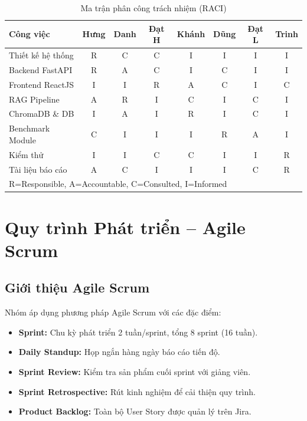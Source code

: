 \begin{table}[H]
  \centering
  \caption{Ma trận phân công trách nhiệm (RACI)}
  \label{tab:raci}
  \renewcommand{\arraystretch}{1.4}
  \begin{tabularx}{\textwidth}{|l|c|c|c|c|c|c|c|}
    \hline
    \rowcolor{blue!10}
    \textbf{Công việc} & \textbf{Hưng} & \textbf{Danh} & \textbf{Đạt H} & \textbf{Khánh} & \textbf{Dũng} & \textbf{Đạt L} & \textbf{Trinh} \\
    \hline
    Thiết kế hệ thống & R & C & C & I & I & I & I \\
    \hline
    Backend FastAPI & R & A & C & I & C & I & I \\
    \hline
    Frontend ReactJS & I & I & R & A & C & I & C \\
    \hline
    RAG Pipeline & A & R & I & C & I & C & I \\
    \hline
    ChromaDB \& DB & I & A & I & R & I & C & I \\
    \hline
    Benchmark Module & C & I & I & I & R & A & I \\
    \hline
    Kiểm thử & I & I & C & C & I & I & R \\
    \hline
    Tài liệu báo cáo & A & C & I & I & I & C & R \\
    \hline
    \multicolumn{8}{l}{\small R=Responsible, A=Accountable, C=Consulted, I=Informed} \\
  \end{tabularx}
\end{table}

\section{Quy trình Phát triển -- Agile Scrum}

\subsection{Giới thiệu Agile Scrum}

Nhóm áp dụng phương pháp Agile Scrum với các đặc điểm:
\begin{itemize}[itemsep=3pt]
  \item \textbf{Sprint:} Chu kỳ phát triển 2 tuần/sprint, tổng 8 sprint (16 tuần).
  \item \textbf{Daily Standup:} Họp ngắn hàng ngày báo cáo tiến độ.
  \item \textbf{Sprint Review:} Kiểm tra sản phẩm cuối sprint với giảng viên.
  \item \textbf{Sprint Retrospective:} Rút kinh nghiệm để cải thiện quy trình.
  \item \textbf{Product Backlog:} Toàn bộ User Story được quản lý trên Jira.
\end{itemize}

